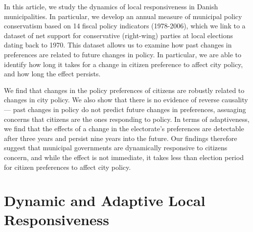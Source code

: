 \documentclass[a4paper,12pt]{article}
\begin{document}
In this article, we study the dynamics of local responsiveness in Danish municipalities. In particular, we develop an annual measure of municipal policy conservatism based on 14 fiscal policy indicators (1978-2006), which we link to a dataset of net support for conservative (right-wing) parties at local elections dating back to 1970.  This dataset allows us to examine how past changes in preferences are related to future changes in policy. In particular, we are able to identify how long it takes for a change in citizen preference to affect city policy, and how long the effect persists.

We find that changes in the policy preferences of citizens are robustly related to changes in city policy. We also show that there is no evidence of reverse causality--- past changes in policy do not predict future changes in preferences, assuaging concerns that citizens are the ones responding to policy. In terms of adaptiveness, we find that the effects of a change in the electorate's preferences are detectable after three years and persist nine years into the future. Our findings therefore suggest that municipal governments are dynamically responsive to citizens concern, and while the effect is not immediate, it takes less than election period for citizen preferences to affect city policy.





\section*{Dynamic and Adaptive Local Responsiveness}
\end{document}
